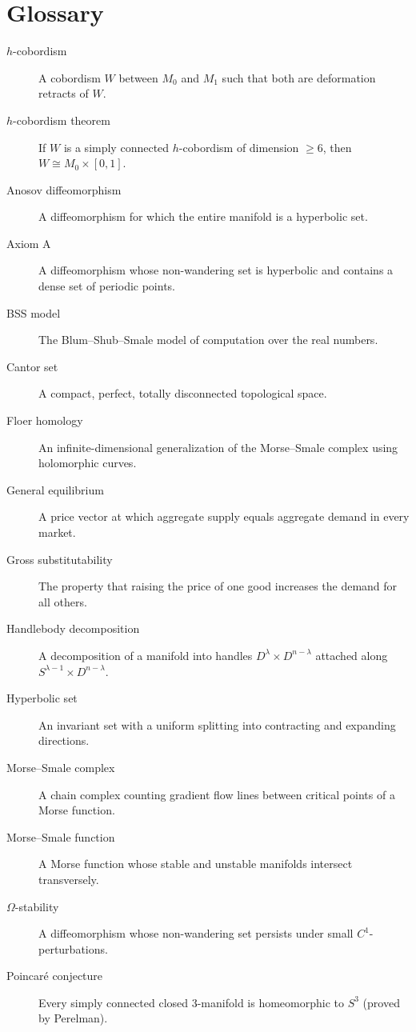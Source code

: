 \section*{Glossary}

\begin{description}
    \item[\(h\)-cobordism] A cobordism \(W\) between \(M_0\) and \(M_1\) such that both are deformation retracts of \(W\).
    \item[\(h\)-cobordism theorem] If \(W\) is a simply connected \(h\)-cobordism of dimension \(\geq 6\), then \(W \cong M_0 \times [0,1]\).
    \item[Anosov diffeomorphism] A diffeomorphism for which the entire manifold is a hyperbolic set.
    \item[Axiom A] A diffeomorphism whose non-wandering set is hyperbolic and contains a dense set of periodic points.
    \item[BSS model] The Blum--Shub--Smale model of computation over the real numbers.
    \item[Cantor set] A compact, perfect, totally disconnected topological space.
    \item[Floer homology] An infinite-dimensional generalization of the Morse--Smale complex using holomorphic curves.
    \item[General equilibrium] A price vector at which aggregate supply equals aggregate demand in every market.
    \item[Gross substitutability] The property that raising the price of one good increases the demand for all others.
    \item[Handlebody decomposition] A decomposition of a manifold into handles \(D^\lambda \times D^{n-\lambda}\) attached along \(S^{\lambda-1} \times D^{n-\lambda}\).
    \item[Hyperbolic set] An invariant set with a uniform splitting into contracting and expanding directions.
    \item[Morse--Smale complex] A chain complex counting gradient flow lines between critical points of a Morse function.
    \item[Morse--Smale function] A Morse function whose stable and unstable manifolds intersect transversely.
    \item[\(\Omega\)-stability] A diffeomorphism whose non-wandering set persists under small \(C^1\)-perturbations.
    \item[Poincar\'e conjecture] Every simply connected closed 3-manifold is homeomorphic to \(S^3\) (proved by Perelman).

\end{description}
